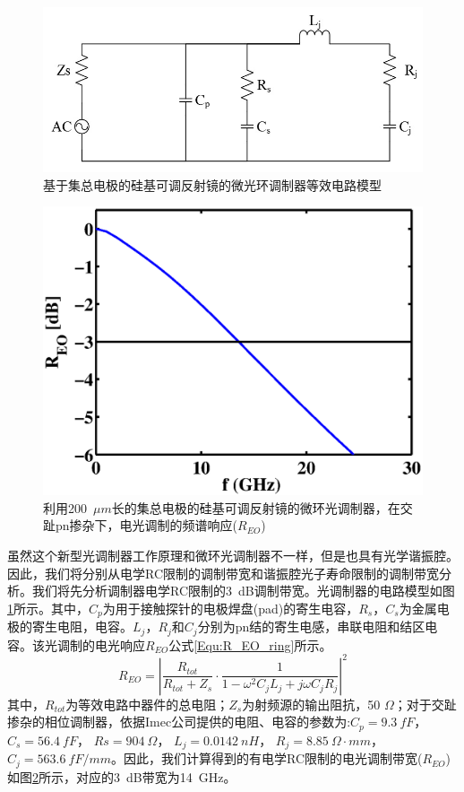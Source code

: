 \begin{figure}[htb]
	\centering
	\includegraphics[width=12cm]{./Pictures/chapt5_tunable_reflection_ring_modulator_equit_circuit.jpg}
	\caption{基于集总电极的硅基可调反射镜的微光环调制器等效电路模型}
	\label{chapt5_tunable_reflection_ring_modulator_equit_circuit}
\end{figure}
\begin{figure}[htb]
	\centering
	\includegraphics[width=12cm]{./Pictures/chapt5_bandwidth.eps}
	\caption{利用200~$\mu m$长的集总电极的硅基可调反射镜的微环光调制器，在交趾pn掺杂下，电光调制的频谱响应($R_{EO}$)}
	\label{chapt5_bandwidth}
\end{figure}

虽然这个新型光调制器工作原理和微环光调制器不一样，但是也具有光学谐振腔。因此，我们将分别从电学RC限制的调制带宽和谐振腔光子寿命限制的调制带宽分析。我们将先分析调制器电学RC限制的3~dB调制带宽。光调制器的电路模型如图\ref{chapt5_tunable_reflection_ring_modulator_equit_circuit}所示。其中，$C_p$为用于接触探针的电极焊盘(pad)的寄生电容，$R_s$，$C_s$为金属电极的寄生电阻，电容。$L_j$，$R_j$和$C_j$分别为pn结的寄生电感，串联电阻和结区电容。该光调制的电光响应$R_{EO}$公式\ref{Equ:R_EO_ring}所示。
\begin{equation}
\label{Equ:R_EO_ring}
R_{EO} = \left|\frac{R_{tot}}{R_{tot}+Z_s}\cdot\frac{1}{1-\omega^2C_jL_j+j\omega C_j R_j}\right|^2
\end{equation}
其中，$R_{tot}$为等效电路中器件的总电阻；$Z_s$为射频源的输出阻抗，50 $\Omega$；对于交趾掺杂的相位调制器，依据Imec公司\cite{Imec}提供的电阻、电容的参数为:$C_p = 9.3~fF$， $C_s = 56.4~fF$， $Rs = 904~\Omega$， $L_j = 0.0142~nH$， $R_j = 8.85~\Omega\cdot mm$， $C_j = 563.6~fF/mm$。因此，我们计算得到的有电学RC限制的电光调制带宽($R_{EO}$)如图\ref{chapt5_bandwidth}所示，对应的3~dB带宽为14~GHz。

